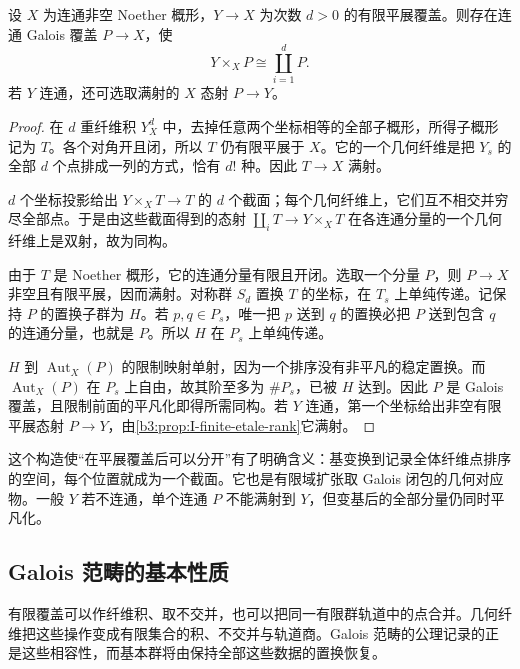 \begin{proposition}\label{b3:prop:I-etale-local-trivialization}\label{b3:prop:I-galois-dominating-cover}
	设 \(X\) 为连通非空 Noether 概形，\(Y\rightarrow X\) 为次数 \(d>0\) 的有限平展覆盖。则存在连通 Galois 覆盖 \(P\rightarrow X\)，使
	\[
		Y\times_XP\cong\coprod_{i=1}^{d}P.
	\]
	若 \(Y\) 连通，还可选取满射的 \(X\) 态射 \(P\rightarrow Y\)。
\end{proposition}
\begin{proof}
	在 \(d\) 重纤维积 \(Y_X^d\) 中，去掉任意两个坐标相等的全部子概形，所得子概形记为 \(T\)。各个对角开且闭，所以 \(T\) 仍有限平展于 \(X\)。它的一个几何纤维是把 \(Y_s\) 的全部 \(d\) 个点排成一列的方式，恰有 \(d!\) 种。因此 \(T\rightarrow X\) 满射。

	\(d\) 个坐标投影给出 \(Y\times_XT\rightarrow T\) 的 \(d\) 个截面；每个几何纤维上，它们互不相交并穷尽全部点。于是由这些截面得到的态射 \(\coprod_iT\rightarrow Y\times_XT\) 在各连通分量的一个几何纤维上是双射，故为同构。

	由于 \(T\) 是 Noether 概形，它的连通分量有限且开闭。选取一个分量 \(P\)，则 \(P\rightarrow X\) 非空且有限平展，因而满射。对称群 \(S_d\) 置换 \(T\) 的坐标，在 \(T_s\) 上单纯传递。记保持 \(P\) 的置换子群为 \(H\)。若 \(p,q\in P_s\)，唯一把 \(p\) 送到 \(q\) 的置换必把 \(P\) 送到包含 \(q\) 的连通分量，也就是 \(P\)。所以 \(H\) 在 \(P_s\) 上单纯传递。

	\(H\) 到 \(\operatorname{Aut}_X(P)\) 的限制映射单射，因为一个排序没有非平凡的稳定置换。而 \(\operatorname{Aut}_X(P)\) 在 \(P_s\) 上自由，故其阶至多为 \(\#P_s\)，已被 \(H\) 达到。因此 \(P\) 是 Galois 覆盖，且限制前面的平凡化即得所需同构。若 \(Y\) 连通，第一个坐标给出非空有限平展态射 \(P\rightarrow Y\)，由\cref{b3:prop:I-finite-etale-rank}它满射。
\end{proof}

这个构造使“在平展覆盖后可以分开”有了明确含义：基变换到记录全体纤维点排序的空间，每个位置就成为一个截面。它也是有限域扩张取 Galois 闭包的几何对应物。一般 \(Y\) 若不连通，单个连通 \(P\) 不能满射到 \(Y\)，但变基后的全部分量仍同时平凡化。

\subsection{Galois 范畴的基本性质}
\label{b3:subsec:I01:03}

有限覆盖可以作纤维积、取不交并，也可以把同一有限群轨道中的点合并。几何纤维把这些操作变成有限集合的积、不交并与轨道商。Galois 范畴的公理记录的正是这些相容性，而基本群将由保持全部这些数据的置换恢复。

